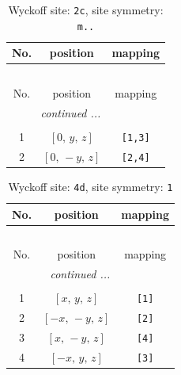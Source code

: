 \documentclass[fleqn,8pt]{jsarticle}
\begin{document}
\begin{longtable}{ccc}
\caption{Wyckoff site: {\tt 2c}, site symmetry: {\tt m..}}
 \\
 \hline \hline
No. & position & mapping \\ \hline \endfirsthead

\multicolumn{2}{l}{\tablename\ \thetable{}} \\
 \hline \hline
No. & position & mapping \\ \hline \endhead

 \hline \hline
\multicolumn{2}{r}{\footnotesize\it continued ...} \\ \endfoot

 \hline \hline
\multicolumn{2}{r}{} \\ \endlastfoot

1 & $\left[ 0,\, y,\, z \right]$ & {\tt [1,3]} \\ \hline
2 & $\left[ 0,\, - y,\, z \right]$ & {\tt [2,4]} \\
\end{longtable}
\renewcommand{\arraystretch}{1.2}
\begin{longtable}{ccc}
\caption{Wyckoff site: {\tt 4d}, site symmetry: {\tt 1}}
 \\
 \hline \hline
No. & position & mapping \\ \hline \endfirsthead

\multicolumn{2}{l}{\tablename\ \thetable{}} \\
 \hline \hline
No. & position & mapping \\ \hline \endhead

 \hline \hline
\multicolumn{2}{r}{\footnotesize\it continued ...} \\ \endfoot

 \hline \hline
\multicolumn{2}{r}{} \\ \endlastfoot

1 & $\left[ x,\, y,\, z \right]$ & {\tt [1]} \\ \hline
2 & $\left[ - x,\, - y,\, z \right]$ & {\tt [2]} \\ \hline
3 & $\left[ x,\, - y,\, z \right]$ & {\tt [4]} \\ \hline
4 & $\left[ - x,\, y,\, z \right]$ & {\tt [3]} \\
\end{longtable}
\end{document}
